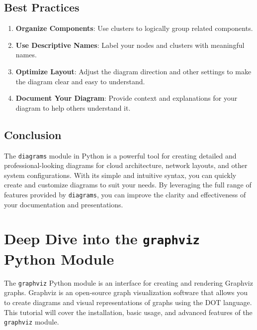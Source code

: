 \documentclass[
  letterpaper,
  DIV=11,
  numbers=noendperiod]{scrreprt}
\providecommand{\tightlist}{%
  \setlength{\itemsep}{0pt}\setlength{\parskip}{0pt}}\usepackage{longtable,booktabs,array}
\begin{document}
\section{Best Practices}\label{best-practices-6}

\begin{enumerate}
\def\labelenumi{\arabic{enumi}.}
\tightlist
\item
  \textbf{Organize Components}: Use clusters to logically group related
  components.
\item
  \textbf{Use Descriptive Names}: Label your nodes and clusters with
  meaningful names.
\item
  \textbf{Optimize Layout}: Adjust the diagram direction and other
  settings to make the diagram clear and easy to understand.
\item
  \textbf{Document Your Diagram}: Provide context and explanations for
  your diagram to help others understand it.
\end{enumerate}

\section{Conclusion}\label{conclusion-39}

The \texttt{diagrams} module in Python is a powerful tool for creating
detailed and professional-looking diagrams for cloud architecture,
network layouts, and other system configurations. With its simple and
intuitive syntax, you can quickly create and customize diagrams to suit
your needs. By leveraging the full range of features provided by
\texttt{diagrams}, you can improve the clarity and effectiveness of your
documentation and presentations.


\chapter{\texorpdfstring{Deep Dive into the \texttt{graphviz} Python
Module}{Deep Dive into the graphviz Python Module}}\label{deep-dive-into-the-graphviz-python-module}

The \texttt{graphviz} Python module is an interface for creating and
rendering Graphviz graphs. Graphviz is an open-source graph
visualization software that allows you to create diagrams and visual
representations of graphs using the DOT language. This tutorial will
cover the installation, basic usage, and advanced features of the
\texttt{graphviz} module.
\end{document}
